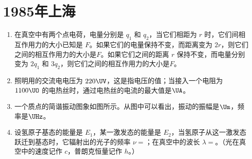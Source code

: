 \documentclass[\gkver]{gaokaozhenti}
\begin{document}
\chapter{1985年上海}

\begin{enumerate}
\item
在真空中有两个点电荷，电量分别是 $q_{1}$ 和 $q_{2}$，当它们相距为 $r$ 时，它们间相互作用力的大小已知是 $F$。如果它们的电量保持不变，而距离变为 $2r$，则它们之间的相互作用力的大小是$F$。如果它们之间的距离 $r$ 保持不变，而电量分别变为 $2q_{1}$ 和 $3q_{2}$，则它们之间的相互作用力的大小是$F$。



\item
照明用的交流电电压为 $220\UV$，这是指电压的值；当接入一个电阻为 $1100\UO$ 的电热丝时，通过电热丝的电流的最大值是$\UA$。



\item
一个质点的简谐振动图象如图所示。从图中可以看出，振动的振幅是$\Um$，频率是$\UHz$。
\onepicture[align=right, w=6cm]{}



\item
设氢原子基态的能量是 $E_{1}$，某一激发态的能量是 $E_{2}$，当氢原子从这一激发态跃迁到基态时，它辐射出的光子的频率 $\nu =$；在真空中的波长 $\lambda =$。（光在真空中的速度记作 $c$，普朗克恒量记作 $h$。）


\end{enumerate}
\end{document}
